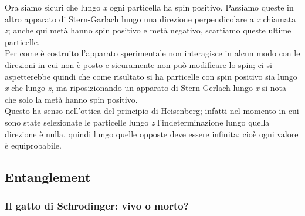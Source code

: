 Ora siamo sicuri che lungo \textit{x} ogni particella ha spin positivo. Passiamo queste in altro apparato di  Stern-Garlach lungo una direzione perpendicolare a \textit{x} chiamata \textit{z}; anche qui metà hanno spin positivo e metà negativo, scartiamo queste ultime particelle.\\
Per come è costruito l'apparato sperimentale non interagisce in alcun modo con le direzioni in cui non è posto e sicuramente non può modificare lo spin; ci si aspetterebbe quindi che come risultato si ha particelle con spin positivo sia lungo \textit{x} che lungo \textit{z}, ma riposizionando un apparato di Stern-Gerlach lungo \textit{x} si nota che solo la metà hanno spin positivo.\\
Questo ha senso nell'ottica del principio di Heisenberg; infatti nel momento in cui sono state selezionate le particelle lungo \textit{z} l'indeterminazione lungo quella direzione è nulla, quindi lungo quelle opposte deve essere infinita; cioè ogni valore è equiprobabile.
\subsection{Entanglement}
\label{sec:entanglement}
\subsubsection{Il gatto di Schrodinger: vivo o morto?}
